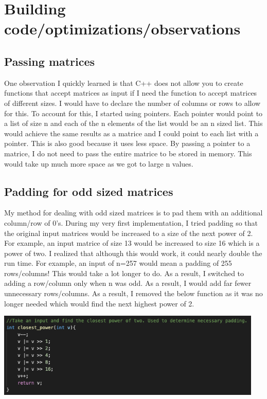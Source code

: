\documentclass{amsart}
\theoremstyle{definition}
\theoremstyle{remark}
\begin{document}
\newpage

\section{Building code/optimizations/observations}
\subsection{Passing matrices}
One observation I quickly learned is that C++ does not allow you to create functions that accept matrices as input if I need the function to accept matrices of different sizes. I would have to declare the number of columns or rows to allow for this. To account for this, I started using pointers. Each pointer would point to a list of size n and each of the n elements of the list would be an n sized list. This would achieve the same results as a matrice and I could point to each list with a pointer. This is also good because it uses less space. By passing a pointer to a matrice, I do not need to pass the entire matrice to be stored in memory. This would take up much more space as we got to large n values. 
\subsection{Padding for odd sized matrices}
My method for dealing with odd sized matrices is to pad them with an additional column/row of 0's. During my very first implementation, I tried padding so that the original input matrices would be increased to a size of the next power of 2. For example, an input matrice of size 13 would be increased to size 16 which is a power of two. I realized that although this would work, it could nearly double the run time. For example, an input of n=257 would mean a padding of 255 rows/columns! This would take a lot longer to do. As a result, I switched to adding a row/column only when n was odd. As a result, I would add far fewer unnecessary rows/columns. As a result, I removed the below function as it was no longer needed which would find the next highest power of 2. 

            \includegraphics[width = 5in]{power.png} 
\newpage
\end{document}
